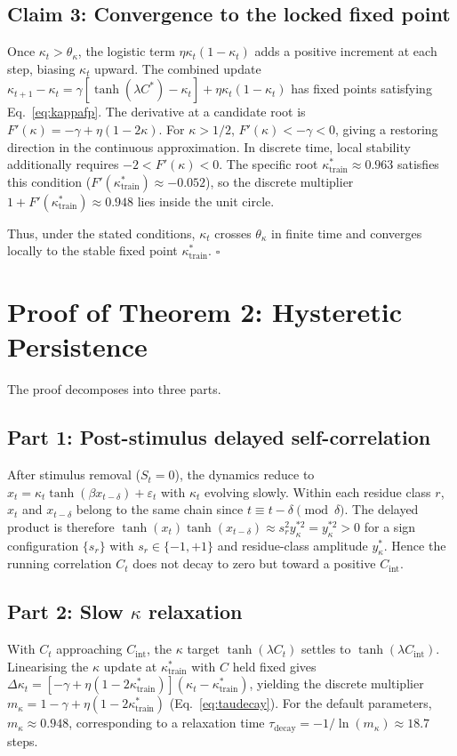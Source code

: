 \documentclass[12pt,a4paper]{article}
\begin{document}
\subsection{Claim 3: Convergence to the locked fixed point}
Once $\kappa_t > \theta_\kappa$, the logistic term $\eta\kappa_t(1-\kappa_t)$ adds a positive increment at each step, biasing $\kappa_t$ upward. The combined update $\kappa_{t+1} - \kappa_t = \gamma[\tanh(\lambda C^*) - \kappa_t] + \eta\kappa_t(1-\kappa_t)$ has fixed points satisfying Eq.~\eqref{eq:kappafp}. The derivative at a candidate root is $F'(\kappa) = -\gamma + \eta(1-2\kappa)$. For $\kappa > 1/2$, $F'(\kappa) < -\gamma < 0$, giving a restoring direction in the continuous approximation. In discrete time, local stability additionally requires $-2 < F'(\kappa) < 0$. The specific root $\kappa^*_{\mathrm{train}} \approx 0.963$ satisfies this condition ($F'(\kappa^*_{\mathrm{train}}) \approx -0.052$), so the discrete multiplier $1 + F'(\kappa^*_{\mathrm{train}}) \approx 0.948$ lies inside the unit circle.

Thus, under the stated conditions, $\kappa_t$ crosses $\theta_\kappa$ in finite time and converges locally to the stable fixed point $\kappa^*_{\mathrm{train}}$. $\square$

\section{Proof of Theorem 2: Hysteretic Persistence}
\label{sec:proof_hysteresis}

The proof decomposes into three parts.

\subsection{Part 1: Post-stimulus delayed self-correlation}
After stimulus removal ($S_t = 0$), the dynamics reduce to $x_t = \kappa_t\tanh(\beta x_{t-\delta}) + \varepsilon_t$ with $\kappa_t$ evolving slowly. Within each residue class $r$, $x_t$ and $x_{t-\delta}$ belong to the same chain since $t \equiv t-\delta \pmod{\delta}$. The delayed product is therefore $\tanh(x_t)\tanh(x_{t-\delta}) \approx s_r^2 y_\kappa^{*2} = y_\kappa^{*2} > 0$ for a sign configuration $\{s_r\}$ with $s_r \in \{-1,+1\}$ and residue-class amplitude $y_\kappa^*$. Hence the running correlation $C_t$ does not decay to zero but toward a positive $C_{\mathrm{int}}$.

\subsection{Part 2: Slow $\kappa$ relaxation}
With $C_t$ approaching $C_{\mathrm{int}}$, the $\kappa$ target $\tanh(\lambda C_t)$ settles to $\tanh(\lambda C_{\mathrm{int}})$. Linearising the $\kappa$ update at $\kappa^*_{\mathrm{train}}$ with $C$ held fixed gives $\Delta\kappa_t = [-\gamma + \eta(1-2\kappa^*_{\mathrm{train}})](\kappa_t - \kappa^*_{\mathrm{train}})$, yielding the discrete multiplier $m_\kappa = 1 - \gamma + \eta(1-2\kappa^*_{\mathrm{train}})$ (Eq.~\eqref{eq:taudecay}). For the default parameters, $m_\kappa \approx 0.948$, corresponding to a relaxation time $\tau_{\mathrm{decay}} = -1/\ln(m_\kappa) \approx 18.7$ steps.
\end{document}
